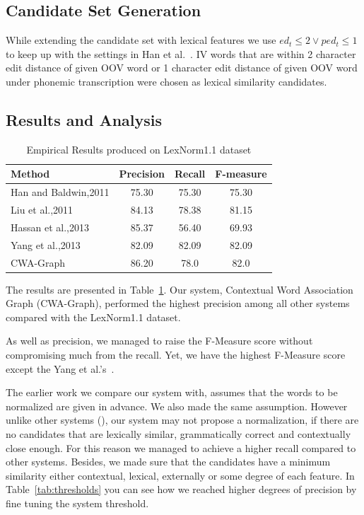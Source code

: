 \documentclass[preprint,review,12pt]{elsarticle}
\begin{document}
\subsection{Candidate Set Generation}

While extending the candidate set with lexical features we use ${ed_t \leq 2} \vee {ped_t \leq 1}$ to keep up with the settings in Han et al.~\cite{Han:2011:LNS:2002472.2002520}. IV words that are within 2 character edit distance of given OOV word or 1 character edit distance of given OOV word under phonemic transcription were chosen as lexical similarity candidates.

\subsection{Results and Analysis}

\begin{table}[thb]
  \centering
  \begin{tabular}[t]{lccc}
    \hline
    Method & Precision & Recall & F-measure \\
    \hline
    Han and Baldwin,2011 & 75.30 & 75.30 & 75.30 \\
    Liu et al.,2011 & 84.13 & 78.38 & 81.15 \\
    Hassan et al.,2013 & 85.37 & 56.40 & 69.93 \\
    Yang et al.,2013 & 82.09 & 82.09 & 82.09 \\
    CWA-Graph   & 86.20 & 78.0 & 82.0 \\
    \hline
  \end{tabular}
  \caption{Empirical Results produced on LexNorm1.1 dataset}
  \label{tab:results}
\end{table}

The results are presented in Table~\ref{tab:results}. Our system, Contextual Word Association Graph (CWA-Graph), performed the highest precision among all other systems compared with the LexNorm1.1 dataset.

As well as precision, we managed to raise the F-Measure score without compromising much from the recall. Yet, we have the highest F-Measure score except the Yang et al.'s~\cite{DBLP:conf/wsdm/YangL11}.

The earlier work we compare our system with, assumes that the words to be normalized are given in advance. We also made the same assumption. However unlike other systems (\cite{DBLP:conf/wsdm/YangL11, liu2012broad, Han:2011:LNS:2002472.2002520}), our system may not propose a normalization, if there are no candidates that are lexically similar, grammatically correct and contextually close enough. For this reason we managed to achieve a higher recall compared to other systems. Besides, we made sure that the candidates have a minimum similarity either contextual, lexical, externally or some degree of each feature. In Table~\ref{tab:thresholds} you can see how we reached higher degrees of precision by fine tuning the system threshold.
\end{document}
